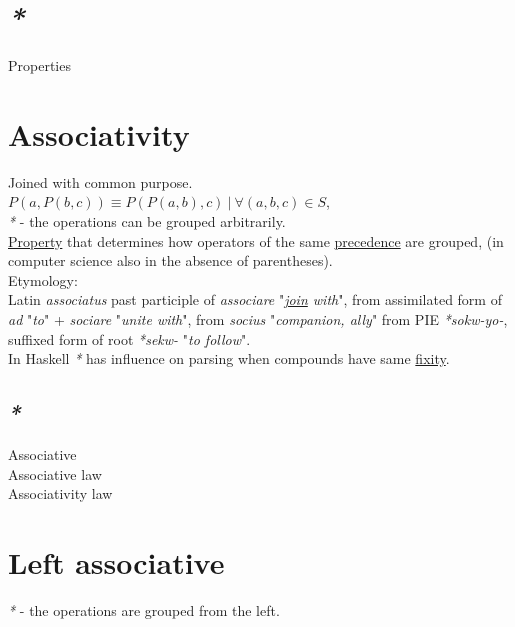 \documentclass[a4paper,14pt,oneside]{book}
\begin{document}
\section{\emph{*}}
\label{sec:org0451504}

\label{org1feb373}Properties\\

\section{\label{orgc68afc4}Associativity}
\label{sec:org0bef272}
Joined with common purpose.\\

\(P(a,P(b,c)) \equiv P(P(a,b),c) \ | \ \forall (a,b,c) \in S\),\\

\emph{*} - the operations can be grouped arbitrarily.\\

\hyperref[org91a1c9f]{Property} that determines how operators of the same \hyperref[org727d14d]{precedence} are grouped, (in computer science also in the absence of parentheses).\\

Etymology:\\
Latin \emph{associatus} past participle of \emph{associare} "\emph{\hyperref[org6ac1525]{join} with}", from assimilated form of \emph{ad} "\emph{to}" + \emph{sociare} "\emph{unite with}", from \emph{socius} "\emph{companion, ally}" from PIE \emph{*sokw-yo-}, suffixed form of root \emph{*sekw-} "\emph{to follow}".\\

In Haskell \emph{*} has influence on parsing when compounds have same \hyperref[orgf771aee]{fixity}.\\

\subsection{\emph{*}}
\label{sec:org4163d6f}

\label{org1621588}Associative\\
\label{org15a360a}Associative law\\
\label{orge7a7e8f}Associativity law\\

\section{\label{org4b513d9}Left associative}
\label{sec:org12e4712}
\emph{*} - the operations are grouped from the left.\\
\end{document}
